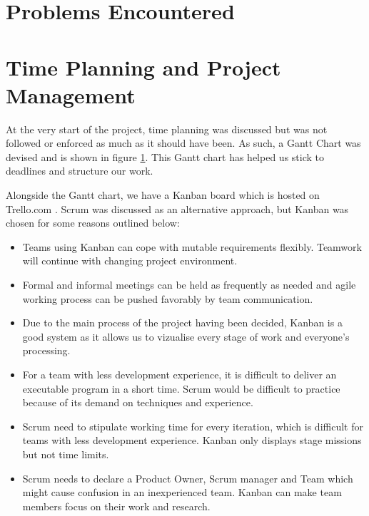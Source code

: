 \documentclass[titlepage]{article}
\begin{document}
\section{Problems Encountered}

\section{Time Planning and Project Management}
At the very start of the project, time planning was discussed but was not followed or enforced as much as it should have been. As such, a Gantt Chart was devised and is shown in figure \ref{ganttchart}. This Gantt chart has helped us stick to deadlines and structure our work.

\begin{figure}\label{ganttchart}
  
\end{figure}

Alongside the Gantt chart, we have a Kanban board which is hosted on Trello.com \cite{trello}. Scrum was discussed as an alternative approach, but Kanban was chosen for some reasons outlined below:

\begin{itemize}
\item Teams using Kanban can cope with mutable requirements flexibly. Teamwork will continue with changing project environment.
\item Formal and informal meetings can be held as frequently as needed and agile working process can be pushed favorably by team communication.
\item Due to the main process of the project having been decided, Kanban is a good system as it allows us to vizualise every stage of work and everyone’s processing.
\item For a team with less development experience, it is difficult to deliver an executable program in a short time. Scrum would be difficult to practice because of its demand on techniques and experience.
\item Scrum need to stipulate working time for every iteration, which is difficult for teams with less development experience. Kanban only displays stage missions but not time limits.
\item Scrum needs to declare a Product Owner, Scrum manager and Team which might cause confusion in an inexperienced team. Kanban can make team members focus on their work and research.
\end{itemize}
\end{document}
